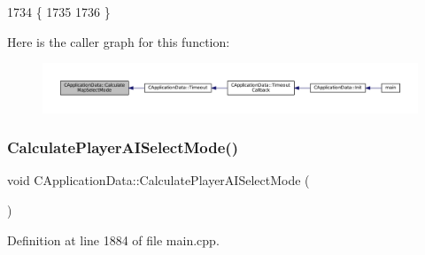 \begin{DoxyCode}
1734                                              \{
1735 
1736 \}
\end{DoxyCode}
Here is the caller graph for this function\+:\nopagebreak
\begin{figure}[H]
\begin{center}
\leavevmode
\includegraphics[width=350pt]{classCApplicationData_a3c481d6483d165488596144a4bcf95cf_icgraph}
\end{center}
\end{figure}
\hypertarget{classCApplicationData_afbd3d397ba6bb36452458cf8f62ef9dc}{}\label{classCApplicationData_afbd3d397ba6bb36452458cf8f62ef9dc} 
\subsubsection{\texorpdfstring{Calculate\+Player\+A\+I\+Select\+Mode()}{CalculatePlayerAISelectMode()}}
{\footnotesize\ttfamily void C\+Application\+Data\+::\+Calculate\+Player\+A\+I\+Select\+Mode (\begin{DoxyParamCaption}{ }\end{DoxyParamCaption})\hspace{0.3cm}{\ttfamily [protected]}}



Definition at line 1884 of file main.\+cpp.


